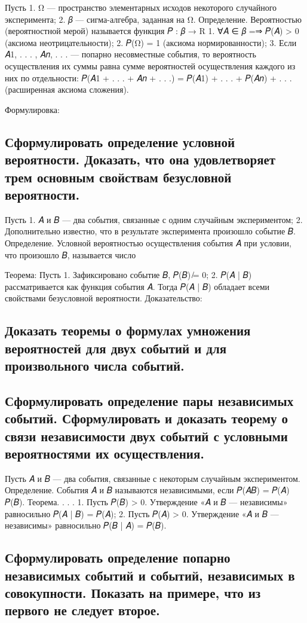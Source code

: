 Пусть 
1. Ω — пространство элементарных исходов некоторого случайного эксперимента;
2. 𝛽 — сигма-алгебра, заданная на Ω.
Определение. Вероятностью (вероятностной мерой) называется функция
𝑃 : 𝛽 → R
1. ∀𝐴 ∈ 𝛽 =⇒ 𝑃(𝐴) > 0 (аксиома неотрицательности); 
2. 𝑃(Ω) = 1 (аксиома нормированности); 
3. Если 𝐴1, . . . , 𝐴𝑛, . . . — попарно несовместные события, то вероятность осуществления их суммы равна сумме вероятностей осуществления каждого из них по отдельности: 𝑃(𝐴1 + . . . + 𝐴𝑛 + . . .) = 𝑃(𝐴1) + . . . + 𝑃(𝐴𝑛) + . . . (расширенная аксиома сложения).

Формулировка:

\subsection{Сформулировать определение условной вероятности. Доказать, что она удовлетворяет трем основным свойствам безусловной вероятности.}

Пусть
1. 𝐴 и 𝐵 — два события, связанные с одним случайным экспериментом;
2. Дополнительно известно, что в результате эксперимента произошло событие 𝐵.
Определение. Условной вероятностью осуществления события 𝐴 при условии, что произошло 𝐵, называется число

Теорема:
Пусть 
1. Зафиксировано событие 𝐵, 𝑃(𝐵) ̸= 0; 
2. 𝑃(𝐴 | 𝐵) рассматривается как функция события 𝐴. 
Тогда 𝑃(𝐴 | 𝐵) обладает всеми свойствами безусловной вероятности.
Доказательство:

\subsection{Доказать теоремы о формулах умножения вероятностей для двух событий и для произвольного числа событий.}
\subsection{Сформулировать определение пары независимых событий. Сформулировать и доказать теорему о связи независимости двух событий с условными вероятностями их осуществления.}

Пусть 𝐴 и 𝐵 — два события, связанные с некоторым случайным экспериментом. 
Определение. События 𝐴 и 𝐵 называются независимыми, если 𝑃(𝐴𝐵) = 𝑃(𝐴) 𝑃(𝐵).
Теорема. . . . 
1. Пусть 𝑃(𝐵) > 0. Утверждение «𝐴 и 𝐵 — независимы» равносильно 𝑃(𝐴 | 𝐵) = 𝑃(𝐴); 
2. Пусть 𝑃(𝐴) > 0. Утверждение «𝐴 и 𝐵 — независимы» равносильно 𝑃(𝐵 | 𝐴) = 𝑃(𝐵).

\subsection{Сформулировать определение попарно независимых событий и событий, независимых в совокупности. Показать на примере, что из первого не следует второе.}

